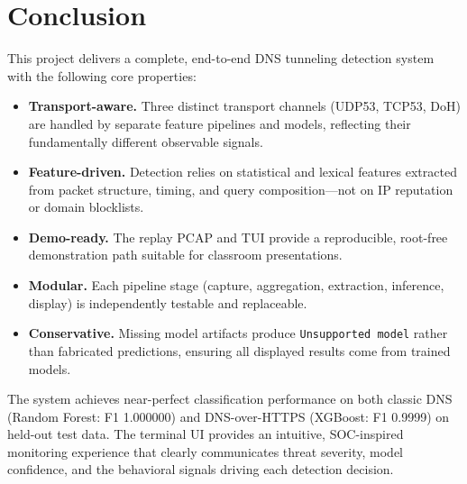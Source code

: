 \documentclass[12pt,a4paper]{article}
\begin{document}
\section{Conclusion}

This project delivers a complete, end-to-end DNS tunneling detection system with the following core properties:

\begin{itemize}
    \item \textbf{Transport-aware.} Three distinct transport channels (UDP53, TCP53, DoH) are handled by separate feature pipelines and models, reflecting their fundamentally different observable signals.
    \item \textbf{Feature-driven.} Detection relies on statistical and lexical features extracted from packet structure, timing, and query composition---not on IP reputation or domain blocklists.
    \item \textbf{Demo-ready.} The replay PCAP and TUI provide a reproducible, root-free demonstration path suitable for classroom presentations.
    \item \textbf{Modular.} Each pipeline stage (capture, aggregation, extraction, inference, display) is independently testable and replaceable.
    \item \textbf{Conservative.} Missing model artifacts produce \texttt{Unsupported model} rather than fabricated predictions, ensuring all displayed results come from trained models.
\end{itemize}

The system achieves near-perfect classification performance on both classic DNS (Random Forest: F1 1.000000) and DNS-over-HTTPS (XGBoost: F1 0.9999) on held-out test data. The terminal UI provides an intuitive, SOC-inspired monitoring experience that clearly communicates threat severity, model confidence, and the behavioral signals driving each detection decision.
\end{document}

